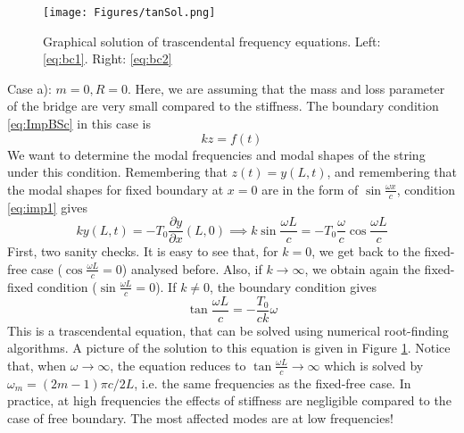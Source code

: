 \documentclass[11pt,twoside,a4paper,english]{book}
\begin{document}
\begin{figure}[hbt]
\texttt{[image: Figures/tanSol.png]}
\caption{Graphical solution of trascendental frequency equations. Left: \eqref{eq:bc1}. Right: \eqref{eq:bc2}}\label{fig:trasc}
\end{figure}

\medskip \medskip 
\noindent 
Case a): $m=0,R=0$. Here, we are assuming that the mass and loss parameter of the bridge are very small compared to the stiffness. The boundary condition \eqref{eq:ImpBSc} in this case is
\begin{equation}\label{eq:imp1}
k z = f(t)
\end{equation}
We want to determine the modal frequencies and modal shapes of the string under this condition. Remembering that $z(t) = y(L,t)$, and remembering that the modal shapes for fixed boundary at $x=0$ are in the form of $\sin \frac{\omega x}{c}$, condition \eqref{eq:imp1} gives
\begin{equation}
k y(L,t) = -T_0 \frac{\partial y}{\partial x}(L,0) \implies k \sin \frac{\omega L}{c} = - T_0 \frac{\omega}{c} \cos \frac{\omega L}{c}
\end{equation}
First, two sanity checks. It is easy to see that, for $k=0$, we get back to the fixed-free case ($\cos \frac{\omega L}{c} = 0$) analysed before. Also, if $k\rightarrow \infty$, we obtain again the fixed-fixed condition ($\sin \frac{\omega L}{c} = 0$). If $k \neq 0$, the boundary condition gives
\begin{equation}\label{eq:bc1}
\tan \frac{\omega L}{c} = - \frac{T_0}{ck}\omega
\end{equation}
This is a trascendental equation, that can be solved using numerical root-finding algorithms. A picture of the solution to this equation is given in Figure \ref{fig:trasc}. Notice that, when $\omega \rightarrow \infty$, the equation reduces to $\tan\frac{\omega L}{c}\rightarrow \infty$ which is solved by $\omega_m = (2m-1)\pi c / 2L$, i.e. the same frequencies as the fixed-free case. In practice, at high frequencies the effects of stiffness are negligible compared to the case of free boundary. The most affected modes are at low frequencies!
\end{document}
